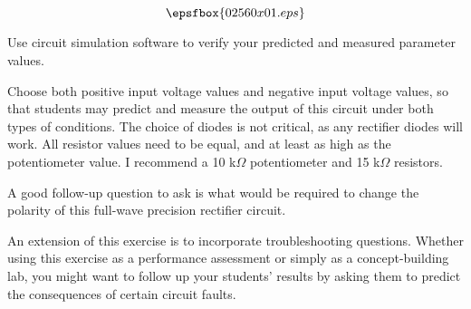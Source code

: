 

$$\epsfbox{02560x01.eps}$$

\vfil \eject






Use circuit simulation software to verify your predicted and measured parameter values.







Choose both positive input voltage values and negative input voltage values, so that students may predict and measure the output of this circuit under both types of conditions.  The choice of diodes is not critical, as any rectifier diodes will work.  All resistor values need to be equal, and at least as high as the potentiometer value.  I recommend a 10 k$\Omega$ potentiometer and 15 k$\Omega$ resistors.

A good follow-up question to ask is what would be required to change the polarity of this full-wave precision rectifier circuit.

An extension of this exercise is to incorporate troubleshooting questions.  Whether using this exercise as a performance assessment or simply as a concept-building lab, you might want to follow up your students' results by asking them to predict the consequences of certain circuit faults.




